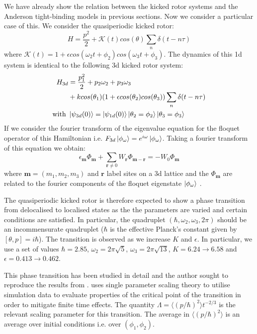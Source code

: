 \documentclass[twocolumn]{report}
\begin{document}
We have already show the relation between the kicked rotor systems and the
Anderson tight-binding models in previous sections. Now we consider a
particular case of this. We consider the quasiperiodic kicked rotor:
%
\begin{equation}
    H = \frac{p^2}{2} + \mathcal{K}(t) cos(\theta) \sum_n \delta(t - n\tau)
\end{equation}
%
where $\mathcal{K}(t) = 1 + \epsilon cos(\omega_2 t + \phi_2)
cos(\omega_3 t + \phi_3)$. The dynamics of this 1d system is identical
to the following 3d kicked rotor system:
%
\begin{align}
    H_{3d} &= \frac{p_1^2}{2} + p_2 \omega_2 + p_3 \omega_3\\
    &+ k cos(\theta_1) (1 + \epsilon cos(\theta_2) cos(\theta_3))
    \sum_n \delta(t - n\tau)\\
    \text{with } &\ket{\psi_{3d}(0)} = \ket{\psi_{1d}(0)}
    \ket{\theta_2 = \phi_2}\ket{\theta_3 = \phi_3}
\end{align}
%
If we consider the fourier transform of the eigenvalue equation
for the floquet operator of this Hamiltonian i.e.
$F_{3d}\ket{\phi_\omega} = e^{i\omega}\ket{\phi_\omega}$.
Taking a fourier transform of this equation we obtain:
%
\begin{equation}
    \epsilon_{\mathbf{m}} \Phi_{\mathbf{m}} + \sum_{\mathbf{r} \neq 0}
    W_{\mathbf{r}}\Phi_{\mathbf{m - r}} = -W_0 \Phi_{\mathbf{m}}
\end{equation}
%
where $\mathbf{m} = (m_1, m_2, m_3)$ and $\mathbf{r}$ label sites on
a 3d lattice and the $\Phi_{\mathbf{m}}$ are related to the fourier
components of the floquet eigenstate $\ket{\phi_\omega}$
\cite{fishman_chaos_1982}\cite{lemarie_universality_2009}.

The quasiperiodic kicked rotor is therefore expected to show a
phase transition from delocalised to localised states as the
the parameters are varied and certain conditions are satisfied.
In particular, the quadruplet $(\hbar, \omega_2, \omega_3, 2\pi)$
should be an incommensurate quadruplet ($\hbar$ is the effective
Planck's constant given by $[\theta, p] = i\hbar$). The transition
is observed as we increase $K$ and $\epsilon$. In particular, we use
a set of values $\hbar =  2.85$, $\omega_2 = 2\pi\sqrt{5}$,
$\omega_3 = 2\pi\sqrt{13}$, $K = 6.24 \to 6.58$ and
$\epsilon = 0.413 \to 0.462$. \cite{lemarie_universality_2009}

This phase transition has been studied in detail and the author
sought to reproduce the results from \cite{lemarie_universality_2009}.
\cite{lemarie_universality_2009} uses single parameter scaling theory
to utilise simulation data to evaluate properties of the critical
point of the transition in order to mitigate finite time effects.
The quantity $\Lambda = \langle (p/\hbar)^2 \rangle t^{-2/3}$ is
the relevant scaling parameter for this transition. The average in
$\langle (p/\hbar)^2 \rangle$ is an average over initial conditions
i.e. over $(\phi_1, \phi_2)$.
\end{document}
